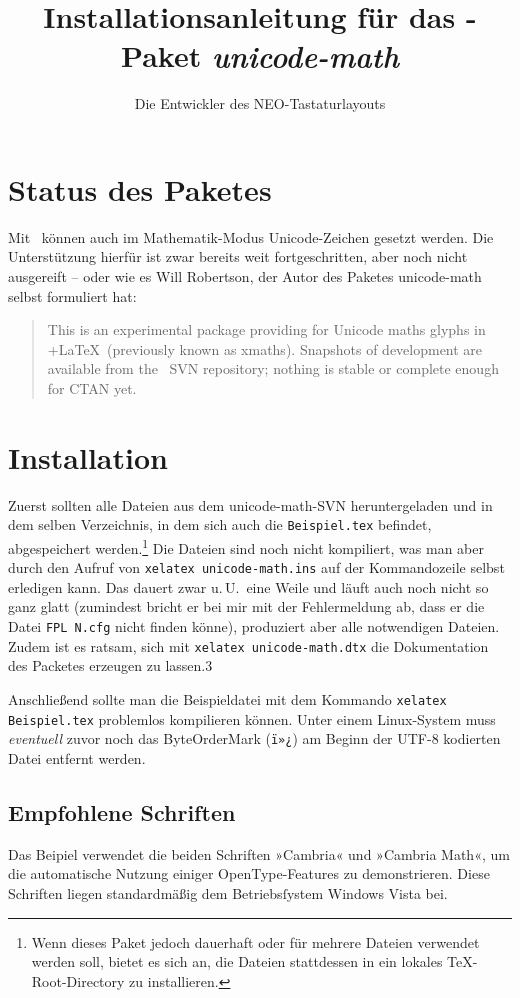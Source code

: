 \documentclass{scrartcl}
\begin{document}
\title{Installationsanleitung für das \XeTeX-Paket \emph{unicode-math}}
\author{Die Entwickler des NEO-Tastaturlayouts}
\maketitle
\tableofcontents

\section{Status des Paketes}
Mit \XeTeX\ können auch im Mathematik-Modus Unicode-Zeichen gesetzt werden. Die Unterstützung hierfür ist zwar bereits weit fortgeschritten, aber noch nicht ausgereift – oder wie es Will Robertson, der Autor des Paketes unicode-math selbst formuliert hat:
\begin{quote}
This is an experimental package providing for Unicode maths glyphs in \XeTeX+\LaTeX\ (previously known as xmaths). Snapshots of development are available from the \XeTeX\ SVN repository; nothing is stable or complete enough for CTAN yet.
\end{quote}

\section{Installation}
Zuerst sollten alle Dateien aus dem unicode-math-SVN heruntergeladen und in dem selben Verzeichnis, in dem sich auch die \verb|Beispiel.tex| befindet, abgespeichert werden.\footnote{Wenn dieses Paket jedoch dauerhaft oder für mehrere Dateien verwendet werden soll, bietet es sich an, die Dateien stattdessen in ein lokales \TeX-Root-Directory zu installieren.} Die Dateien sind noch nicht kompiliert, was man aber durch den Aufruf von \verb|xelatex unicode-math.ins| auf der Kommandozeile selbst erledigen kann. Das dauert zwar u.\,U.\ eine Weile und läuft auch noch nicht so ganz glatt (zumindest bricht er bei mir mit der Fehlermeldung ab, dass er die Datei \verb|FPL N.cfg| nicht finden könne), produziert aber alle notwendigen Dateien. Zudem ist es ratsam, sich mit \verb|xelatex unicode-math.dtx| die Dokumentation des Packetes erzeugen zu lassen.3

Anschließend sollte man die Beispieldatei mit dem Kommando \verb|xelatex Beispiel.tex| problemlos kompilieren können. Unter einem Linux-System muss \emph{eventuell} zuvor noch das ByteOrderMark (\verb|ï»¿|) am Beginn der UTF-8 kodierten Datei entfernt werden.


\subsection{Empfohlene Schriften}
Das Beipiel verwendet die beiden Schriften »Cambria« und »Cambria Math«, um die automatische Nutzung einiger OpenType-Features zu demonstrieren. Diese Schriften liegen standardmäßig dem Betriebsſystem Windows Vista bei.
\end{document}
